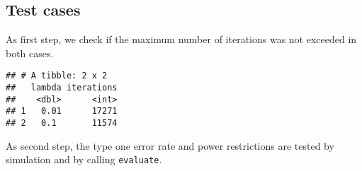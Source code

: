 \documentclass[
]{book}
\newenvironment{Shaded}{\begin{snugshade}}{\end{snugshade}}
\newcommand{\AttributeTok}[1]{\textcolor[rgb]{0.77,0.63,0.00}{#1}}
\newcommand{\FunctionTok}[1]{\textcolor[rgb]{0.00,0.00,0.00}{#1}}
\newcommand{\NormalTok}[1]{#1}
\newcommand{\SpecialCharTok}[1]{\textcolor[rgb]{0.00,0.00,0.00}{#1}}
\begin{document}
\hypertarget{test-cases-13}{%
\subsection{Test cases}\label{test-cases-13}}

As first step, we check if the maximum number of iterations was not exceeded
in both cases.

\begin{Shaded}
\end{Shaded}

\begin{verbatim}
## # A tibble: 2 x 2
##   lambda iterations
##    <dbl>      <int>
## 1   0.01      17271
## 2   0.1       11574
\end{verbatim}

As second step, the type one error rate and power restrictions are tested
by simulation and by calling \texttt{evaluate}.
\end{document}
